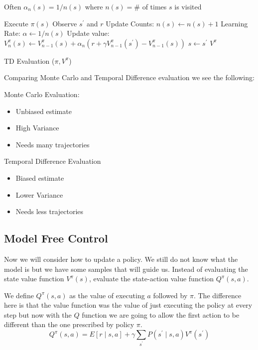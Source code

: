 \documentclass[12pt]{article}
\begin{document}
            Often $\alpha_{n}(s)=1 / n(s)$ where $n(s)=\#$ of times $s$ is visited

            \begin{algorithm}[H] \label{TDEval}
                \SetAlgoLined
                 {
                    Execute $\pi(s)$ \;
                    Observe $s^{\prime}$ and $r$\;
                    Update Counts: $n(s) \gets n(s) + 1$ \;
                    Learning Rate: $\alpha \gets 1/n(s)$ \;
                    Update value: $V_{n}^{\pi}(s) \leftarrow V_{n-1}^{\pi}(s)+\alpha_{n}\left(r+\gamma
                    V_{n-1}^{\pi}\left(s^{\prime}\right)-V_{n-1}^{\pi}(s)\right)$ \;
                    $s \gets s^{\prime}$ \;
                }
                \Return $V^{\pi}$
                \caption{TD Evaluation ($\pi, V^{\pi}$)}
            \end{algorithm}

        Comparing Monte Carlo and Temporal Difference evaluation we see the following:

        Monte Carlo Evaluation:
        \begin{itemize}
            \item Unbiased estimate
            \item High Variance
            \item Needs many trajectories
        \end{itemize}

        Temporal Difference Evaluation
        \begin{itemize}
            \item Biased estimate
            \item Lower Variance
            \item Needs less trajectories
        \end{itemize}
    
    \subsection{Model Free Control}
        Now we will consider how to update a policy. We still do not know what the model is but we have some samples that
        will guide us. Instead of evaluating the state value function $V^{\pi}(s)$, evaluate the state-action value
        function $Q^{\pi}(s, a)$.

        We define $Q^{\pi}(s, a)$ as the value of executing $a$ followed by $\pi$. The difference here is that the value
        function was the value of just executing the policy at every step but now with the $Q$ function we are going to
        allow the first action to be different than the one prescribed by policy $\pi$. 
        $$ Q^{\pi}(s, a) = E[r \mid s, a] + \gamma \sum_{s^{\prime}} P(s^{\prime} \mid s, a) V^{\pi}(s^{\prime}) $$
        
\end{document}
